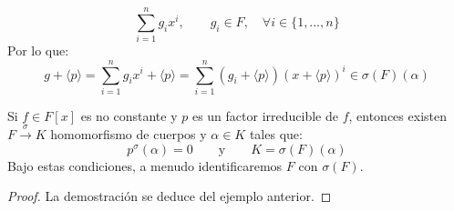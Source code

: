 \begin{ejemplo}
\begin{description}
            \begin{equation*}
                \sum_{i=1}^{n}g_ix^i, \qquad g_i \in F, \quad \forall i \in \{1,\ldots,n\}
            \end{equation*}
            Por lo que:
            \begin{equation*}
                g+\langle p \rangle  = \sum_{i=1}^{n}g_ix^i + \langle p \rangle  = \sum_{i=1}^{n}(g_i+\langle p \rangle ){(x+\langle p \rangle )}^{i} \in \sigma(F)(\alpha)
            \end{equation*}
    \end{description}
\end{ejemplo}

\begin{lema}\label{lema:cuerpo_descomposicion}
    Si $f\in F[x]$ es no constante y $p$ es un factor irreducible de $f$, entonces existen $F\stackrel{\sigma}{\to}K$ homomorfismo de cuerpos y $\alpha\in K$ tales que:
    \begin{equation*}
        p^\sigma(\alpha) = 0 \qquad \text{y}\qquad  K = \sigma(F)(\alpha)
    \end{equation*}
    Bajo estas condiciones, a menudo identificaremos $F$ con $\sigma(F)$.
    \begin{proof}
        La demostración se deduce del ejemplo anterior.
    \end{proof}
\end{lema}

